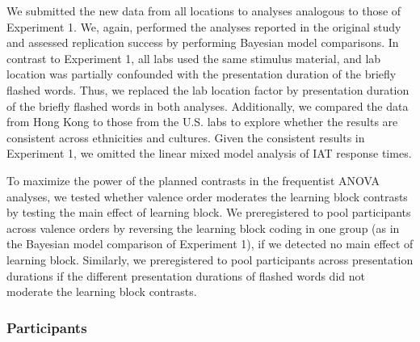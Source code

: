 \documentclass[
  man,floatsintext]{apa6}
\begin{document}
We submitted the new data from all locations to analyses analogous to those of Experiment 1.
We, again, performed the analyses reported in the original study and assessed replication success by performing Bayesian model comparisons.
In contrast to Experiment 1, all labs used the same stimulus material, and lab location was partially confounded with the presentation duration of the briefly flashed words.
Thus, we replaced the lab location factor by presentation duration of the briefly flashed words in both analyses.
Additionally, we compared the data from Hong Kong to those from the U.S. labs to explore whether the results are consistent across ethnicities and cultures.
Given the consistent results in Experiment 1, we omitted the linear mixed model analysis of IAT response times.

To maximize the power of the planned contrasts in the frequentist ANOVA analyses, we tested whether valence order moderates the learning block contrasts by testing the main effect of learning block.
We preregistered to pool participants across valence orders by reversing the learning block coding in one group (as in the Bayesian model comparison of Experiment 1), if we detected no main effect of learning block.
Similarly, we preregistered to pool participants across presentation durations if the different presentation durations of flashed words did not moderate the learning block contrasts.

\hypertarget{participants-1}{%
\subsubsection{Participants}\label{participants-1}}
\end{document}
